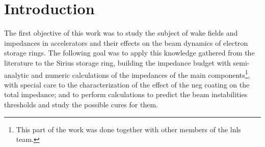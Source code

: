 
% 




% 


	\frenchspacing

	\pretextual
	

	\textual

\chapter{Introduction} \label{chap:intro}

    The first objective of this work was to study the subject of wake fields and impedances in accelerators and their effects on the beam dynamics of electron storage rings. The following goal was to apply this knowledge gathered from the literature to the Sirius storage ring, building the impedance budget with semi-analytic and numeric calculations of the impedances of the main components\footnote{This part of the work was done together with other members of the \gls{lnls} team.}, with special care to the characterization of the effect of the \gls{neg} coating on the total impedance; and to perform calculations to predict the beam instabilities thresholds and study the possible cures for them.

